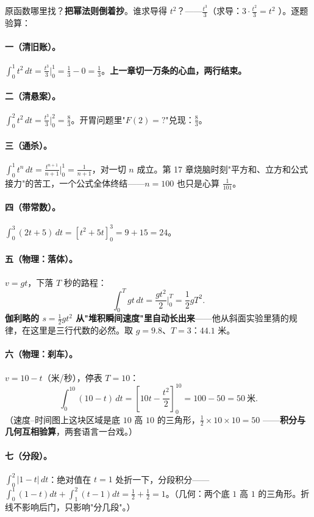 原函数哪里找？\textbf{把幂法则倒着抄}。谁求导得 $t^2$？——$\tfrac{t^3}{3}$（求导：$3\cdot\tfrac{t^2}{3} = t^2$ \checkmark）。逐题验算：

\paragraph{一（清旧账）。}$\displaystyle\int_0^1 t^2\,dt = \frac{t^3}{3}\Big|_0^1 = \frac13 - 0 = \frac13$。\textbf{上一章切一万条的心血，两行结束。}

\paragraph{二（清悬案）。}$\displaystyle\int_0^2 t^2\,dt = \frac{t^3}{3}\Big|_0^2 = \frac83$。开胃问题里"$F(2) = ?$"兑现：$\tfrac83$。

\paragraph{三（通杀）。}$\displaystyle\int_0^1 t^n\,dt = \frac{t^{n+1}}{n+1}\bigg|_0^1 = \frac{1}{n+1}$，对一切 $n$ 成立。第 17 章烧脑时刻"平方和、立方和公式接力"的苦工，一个公式全体终结——$n = 100$ 也只是心算 $\tfrac1{101}$。

\paragraph{四（带常数）。}$\displaystyle\int_0^3 (2t + 5)\,dt = \left[t^2 + 5t\right]_0^3 = 9 + 15 = 24$。

\paragraph{五（物理：落体）。}$v = gt$，下落 $T$ 秒的路程：
\[
\int_0^T gt\,dt = \frac{g t^2}{2}\Big|_0^T = \frac12 gT^2 .
\]
\textbf{伽利略的 $s = \tfrac12 g t^2$ 从"堆积瞬间速度"里自动长出来}——他从斜面实验里猜的规律，在这里是三行代数的必然。取 $g = 9.8$、$T = 3$：$44.1$ 米。

\paragraph{六（物理：刹车）。}$v = 10 - t$（米/秒），停表 $T = 10$：
\[
\int_0^{10}(10 - t)\,dt = \left[10t - \frac{t^2}2\right]_0^{10} = 100 - 50 = 50\ \text{米}.
\]
（速度--时间图上这块区域是底 $10$ 高 $10$ 的三角形，$\tfrac12\times10\times10 = 50$ \checkmark——\textbf{积分与几何互相验算}，两套语言一台戏。）

\paragraph{七（分段）。}$\displaystyle\int_0^2 |1 - t|\,dt$：绝对值在 $t = 1$ 处折一下，分段积分——$\int_0^1 (1-t)dt + \int_1^2(t-1)dt = \tfrac12 + \tfrac12 = 1$。（几何：两个底 $1$ 高 $1$ 的三角形。折线不影响后门，只影响"分几段"。）

